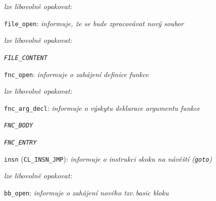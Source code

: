 \newpage
\begin{myitemize}[itemsep=0pt,partopsep=0pt,parsep=0pt,topsep=0pt,label=\textbullet]
  \item[\ndash] \textsl{lze libovolně opakovat:}
    \begin{myitemize}[itemsep=0pt,partopsep=0pt,parsep=0pt,topsep=0pt,label=\textbullet]
      \item \texttt{file\_open}: \textit{informuje, že se bude zpracovávat nový soubor}
      \item[\ndash] \textsl{lze libovolně opakovat:}
        \begin{myitemize}
          \item[\whitebullet] \texttt{\textit{FILE\_CONTENT}}
            \begin{myitemize}[itemsep=0pt,partopsep=0pt,parsep=0pt,topsep=0pt,label=\textbullet]
              \item \texttt{fnc\_open}: \textit{informuje o zahájení definice funkce}
              \item[\ndash] \textsl{lze libovolně opakovat:}
                \begin{myitemize}[itemsep=0pt,partopsep=0pt,parsep=0pt,topsep=0pt,label=\textbullet]
                  \item \texttt{fnc\_arg\_decl}: \textit{informuje o výskytu deklarace argumentu funkce}
                \end{myitemize}
              \item[\whitebullet] \texttt{\textit{FNC\_BODY}}
                \begin{myitemize}[itemsep=0pt,partopsep=0pt,parsep=0pt,topsep=0pt,label=\textbullet]
                  \item[\whitebullet] \texttt{\textit{FNC\_ENTRY}}
                    \begin{myitemize}[itemsep=0pt,partopsep=0pt,parsep=0pt,topsep=0pt,label=\textbullet]
                        \item \texttt{insn} (\texttt{CL\_INSN\_JMP}): \textit{informuje o instrukci skoku na návěští (\texttt{goto})}
                    \end{myitemize}
                  \item[\ndash] \textsl{lze libovolně opakovat:}
                    \begin{myitemize}[itemsep=0pt,partopsep=0pt,parsep=0pt,topsep=0pt,label=\textbullet]
                      \item \texttt{bb\_open}: \textit{informuje o zahájení nového tzv.\,\emph{basic bloku}%
}
\end{myitemize}
\end{myitemize}
\end{myitemize}
\end{myitemize}
\end{myitemize}
\end{myitemize}
